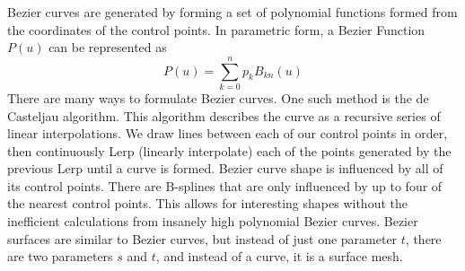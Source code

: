 Bezier curves are generated by forming a set of polynomial functions formed from the coordinates of the control points. In parametric form, a Bezier Function $P(u)$ can be represented as \[P(u) = \sum_{k=0}^{n}p_kB_{kn}(u)\]
There are many ways to formulate Bezier curves. One such method is the de Casteljau algorithm. This algorithm describes the curve as a recursive series of linear interpolations. We draw lines between each of our control points in order, then continuously Lerp (linearly interpolate) each of the points generated by the previous Lerp until a curve is formed.
\newline
\newline
Bezier curve shape is influenced by all of its control points. There are B-splines that are only influenced by up to four of the nearest control points. This allows for interesting shapes without the inefficient calculations from insanely high polynomial Bezier curves.
\newline
\newline
Bezier surfaces are similar to Bezier curves, but instead of just one parameter $t$, there are two parameters $s$ and $t$, and instead of a curve, it is a surface mesh.


\newpage